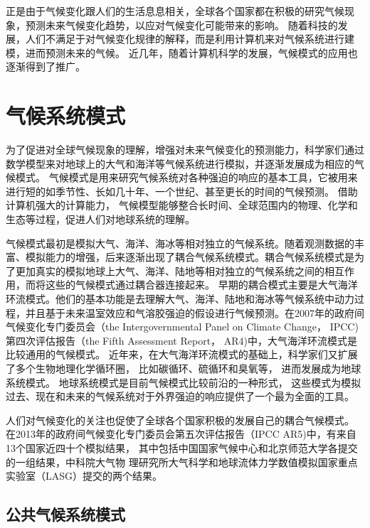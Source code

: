  
正是由于气候变化跟人们的生活息息相关，全球各个国家都在积极的研究气候现象，预测未来气候变化趋势，以应对气候变化可能带来的影响。 
随着科技的发展，人们不满足于对气候变化规律的解释，而是利用计算机来对气候系统进行建模，进而预测未来的气候。
近几年，随着计算机科学的发展，气候模式的应用也逐渐得到了推广。  



 
\section{气候系统模式}

为了促进对全球气候现象的理解，增强对未来气候变化的预测能力，科学家们通过数学模型来对地球上的大气和海洋等气候系统进行模拟，并逐渐发展成为相应的气候模式。
气候模式是用来研究气候系统对各种强迫的响应的基本工具，它被用来进行短的如季节性、长如几十年、一个世纪、甚至更长的时间的气候预测。 
借助计算机强大的计算能力， 气候模型能够整合长时间、全球范围内的物理、化学和生态等过程，促进人们对地球系统的理解\cite{hurrell2013community}。


气候模式最初是模拟大气、海洋、海冰等相对独立的气候系统。随着观测数据的丰富、模拟能力的增强，后来逐渐出现了耦合气候系统模式。耦合气候系统模式是为了更加真实的模拟地球上大气、海洋、陆地等相对独立的气候系统之间的相互作用，而将这些的气候模式通过耦合器连接起来。
早期的耦合模式主要是大气海洋环流模式。他们的基本功能是去理解大气、海洋、陆地和海冰等气候系统中动力过程，并且基于未来温室效应和气溶胶强迫的假设进行气候预测。在2007年的政府间气候变化专门委员会（the
Intergovernmental Panel on Climate Change， IPCC) 第四次评估报告（the Fifth Assessment
Report， AR4)中，大气海洋环流模式是比较通用的气候模式\cite{solomon2007climate}。
近年来，在大气海洋环流模式的基础上，科学家们又扩展了多个生物地理化学循环圈， 比如碳循环、硫循环和臭氧等， 进而发展成为地球系统模式。 地球系统模式是目前气候模式比较前沿的一种形式，
这些模式为模拟过去、现在和未来的气候系统对于外界强迫的响应提供了一个最为全面的工具。 

人们对气候变化的关注也促使了全球各个国家积极的发展自己的耦合气候模式。
在2013年的政府间气候变化专门委员会第五次评估报告（IPCC AR5)中，有来自13个国家近四十个模拟结果，
其中包括中国国家气候中心和北京师范大学各提交的一组结果，中科院大气物
理研究所大气科学和地球流体力学数值模拟国家重点实验室（LASG）提交的两个结果\cite{stocker2013ipcc}。



\subsection{公共气候系统模式}
 

